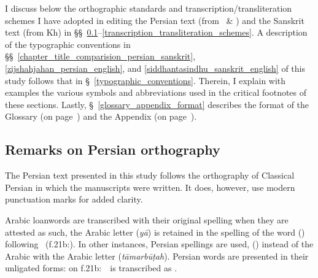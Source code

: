 \renewcommand{\thefootnote}{\arabic{footnote}} %

I discuss below the orthographic standards and transcription/transliteration schemes I have adopted in editing the Persian text (from \SjA\ \& \SjB) and the Sanskrit text (from Kh) in \S\S~\ref{persian_orthography}--\ref{transcription_transliteration_schemes}. A description of the typographic conventions in \S\S\ \ref{chapter_title_comparision_persian_sanskrit}, \ref{zijshahjahan_persian_english}, and \ref{siddhantasindhu_sanskrit_english}  of this study follows that in \S~\ref{typographic_conventions}. Therein, I explain with examples the various symbols and abbreviations used in the critical footnotes of these sections. Lastly, \S~\ref{glossary_appendix_format} describes the format of the Glossary (on page~\pageref{main}) and the Appendix (on page~\pageref{Appendix_verbs}).

\subsection{Remarks on Persian orthography} \label{persian_orthography}
The Persian text presented in this study follows the orthography of Classical Persian in which the manuscripts were written. It does, however, use modern punctuation marks for added clarity. 

Arabic loanwords are transcribed with their original spelling when they are attested as such, \eg the Arabic letter  (\textit{yā}\Ayn) is retained in the spelling of the word  (\thani) following \SjA\ (f.\thinspace 21b:). In other instances, Persian spellings are used, \eg {} (\daraji) instead of the Arabic  with the Arabic letter  (\textit{tā}\Ayn \textit{marbūṭah}). Persian words are presented in their unligated forms: \eg {} on f.21b:~\SjA\ is transcribed as . 

